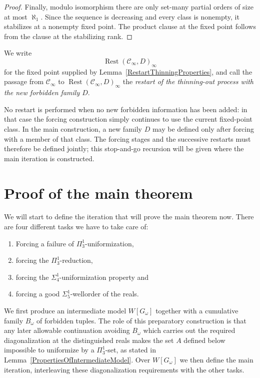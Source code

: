 \documentclass[a4paper,11pt]{article}
\begin{document}
\begin{proof}
Finally, modulo isomorphism there are only set-many partial orders of size at most $\aleph_1$. Since the sequence is decreasing and every class is nonempty, it stabilizes at a nonempty fixed point. The product clause at the fixed point follows from the clause at the stabilizing rank.
\end{proof}

We write
\[
\operatorname{Rest}(\mathcal C_\infty,D)_\infty
\]
for the fixed point supplied by Lemma~\ref{RestartThinningProperties}, and call the passage from $\mathcal C_\infty$ to $\operatorname{Rest}(\mathcal C_\infty,D)_\infty$ the \emph{restart of the thinning-out process with the new forbidden family $D$}.

No restart is performed when no new forbidden information has been added: in that case the forcing construction simply continues to use the current fixed-point class. In the main construction, a new family $D$ may be defined only after forcing with a member of that class. The forcing stages and the successive restarts must therefore be defined jointly; this stop-and-go recursion will be given where the main iteration is constructed.
\section{Proof of the main theorem}

We will start to define the iteration that will prove the main theorem now. There are four different tasks we have to take care of:
\begin{enumerate}
\item Forcing a failure of $\Pi^1_3$-uniformization,
\item forcing the $\Pi^1_3$-reduction,

\item forcing the $\Sigma^1_4$-uniformization property and
\item forcing  a good $\Sigma^1_5$-wellorder of the reals.
\end{enumerate}

We first produce an intermediate model $W[G_\omega]$ together with a cumulative family $B_\omega$ of forbidden tuples. The role of this preparatory construction is that any later allowable continuation avoiding $B_\omega$ which carries out the required diagonalization at the distinguished reals makes the set $A$ defined below impossible to uniformize by a $\Pi^1_3$-set, as stated in Lemma~\ref{PropertiesOfIntermediateModel}. Over $W[G_\omega]$ we then define the main iteration, interleaving these diagonalization requirements with the other tasks. 
\end{document}
